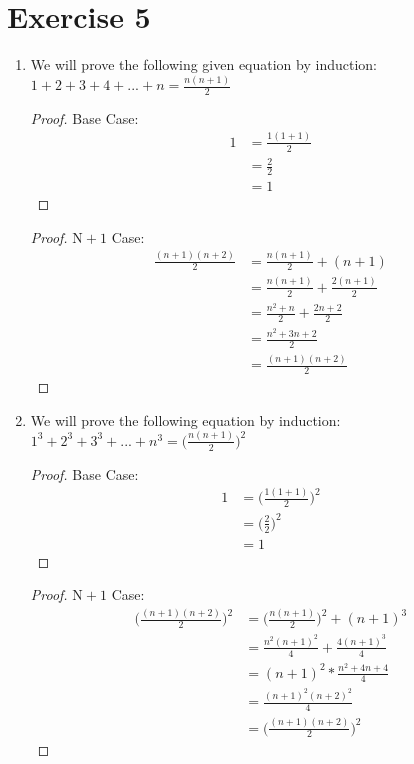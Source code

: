 \documentclass[11pt]{article}
\newcommand{\solution}[1]{{{\color{black}{} {#1}}}}
\begin{document}
\section*{Exercise 5}
\begin{enumerate}
\item
\solution{We will prove the following given equation by induction:\\
$1 + 2 + 3 + 4 + ... + n = \frac{n(n+1)}{2}$ \\
\begin{proof}
Base Case:
\begin{align*}
1&= \frac{1(1+1)}{2} \\
&=\frac{2}{2} \\
&=1
\end{align*}
\end{proof}
\begin{proof}
$\text{N}+1$ Case:
\begin{align*}
\frac{(n+1)(n+2)}{2} &= \frac{n(n+1)}{2} + (n+1)  \\
&=\frac{n(n+1)}{2} + \frac{2(n+1)}{2}\\
&=\frac{n^2+n}{2}+\frac{2n+2}{2}\\
&=\frac{n^2+3n+2}{2}\\
&=\frac{(n+1)(n+2)}{2}
\end{align*}
\end{proof}
}

\item
\solution{We will prove the following equation by induction: \\
$1^3 + 2^3 + 3^3 +...+n^3 = \big(\frac{n(n+1)}{2}\big)^2$
\begin{proof}
Base Case:
\begin{align*}
1&=\bigg(\frac{1(1+1)}{2}\bigg)^2\\
&= \bigg(\frac{2}{2}\bigg)^2\\
&= 1
\end{align*}
\end{proof}
\begin{proof}
$\text{N}+1$ Case:
\begin{align*}
\bigg(\frac{(n+1)(n+2)}{2}\bigg)^2&= \bigg(\frac{n(n+1)}{2}\bigg)^2 + (n+1)^3\\
&=\frac{n^2(n+1)^2}{4}+\frac{4(n+1)^3}{4} \\
&=(n+1)^2*\frac{n^2+4n+4}{4} \\
&=\frac{(n+1)^2(n+2)^2}{4} \\
&=\bigg(\frac{(n+1)(n+2)}{2}\bigg)^2
\end{align*}
\end{proof}
}
\end{enumerate}
\newpage
\end{document}
